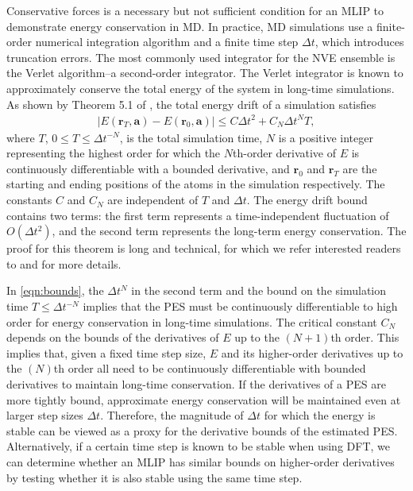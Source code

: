 \documentclass[twocolumn]{fairmeta}
\begin{document}
Conservative forces is a necessary but not sufficient condition for an MLIP to demonstrate energy conservation in MD. In practice, MD simulations use a finite-order numerical integration algorithm and a finite time step $\Delta t$, which introduces truncation errors. The most commonly used integrator for the NVE ensemble is the Verlet algorithm--a second-order integrator. The Verlet integrator is known to approximately conserve the total energy of the system in long-time simulations. As shown by Theorem 5.1 of \citealt{hairer2003geometric}, the total energy drift of a simulation satisfies
\begin{align}
 | E(\bm r_T, \bm a) - E(\bm r_0, \bm a) | \leq C\Delta t^2 + C_N \Delta t^N T,
 \label{eqn:bounds}
\end{align}
where $T$, $0 \leq T \leq \Delta t^{-N}$, is the total simulation time, $N$ is a positive integer representing the highest order for which the $N$th-order derivative of $E$ is continuously differentiable with a bounded derivative, and $\bm r_0$ and $\bm r_T$ are the starting and ending positions of the atoms in the simulation respectively. The constants $C$ and $C_N$ are independent of $T$ and $\Delta t$. The energy drift bound contains two terms: the first term represents a time-independent fluctuation of $O(\Delta t^2)$, and the second term represents the long-term energy conservation. The proof for this theorem is long and technical, for which we refer interested readers to \citealt{hairer2003geometric} and \citealt{hairer2006geometric} for more details.

In \cref{eqn:bounds}, the $\Delta t^N$ in the second term and the bound on the simulation time $T \leq \Delta t^{-N}$ implies that the PES must be continuously differentiable to high order for energy conservation in long-time simulations. The critical constant $C_N$ depends on the bounds of the derivatives of $E$ up to the $(N + 1)$th order. This implies that, given a fixed time step size, $E$ and its higher-order derivatives up to the $(N)$th order all need to be continuously differentiable with bounded derivatives to maintain long-time conservation. If the derivatives of a PES are more tightly bound, approximate energy conservation will be maintained even at larger step sizes $\Delta t$. Therefore, the magnitude of $\Delta t$ for which the energy is stable can be viewed as a proxy for the derivative bounds of the estimated PES. Alternatively, if a certain time step is known to be stable when using DFT, we can determine whether an MLIP has similar bounds on higher-order derivatives by testing whether it is also stable using the same time step. 
\end{document}

